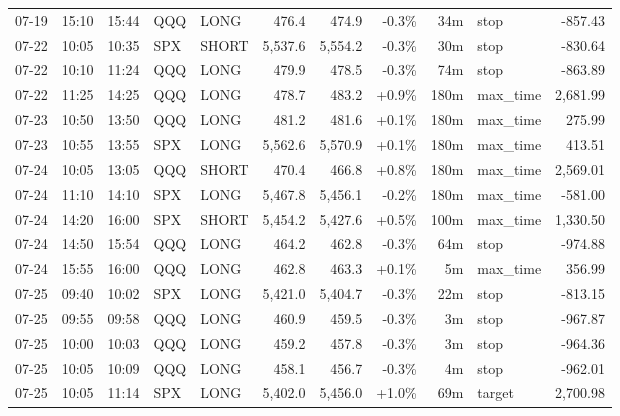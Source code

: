 \documentclass[11pt,a4paper,twoside]{article}
\begin{document}
\begin{center}
\begin{longtable}{>{\color{txtmain}}l l l l l r r r r >{\color{txtmain}}l r}
07-19 & 15:10 & 15:44 & QQQ & LONG & 476.4 & 474.9 & \textcolor{lossred}{-0.3\%} & 34m & stop & \textcolor{lossred}{-857.43} \\
07-22 & 10:05 & 10:35 & SPX & SHORT & 5,537.6 & 5,554.2 & \textcolor{lossred}{-0.3\%} & 30m & stop & \textcolor{lossred}{-830.64} \\
07-22 & 10:10 & 11:24 & QQQ & LONG & 479.9 & 478.5 & \textcolor{lossred}{-0.3\%} & 74m & stop & \textcolor{lossred}{-863.89} \\
07-22 & 11:25 & 14:25 & QQQ & LONG & 478.7 & 483.2 & \textcolor{wingreen}{+0.9\%} & 180m & max\_time & \textcolor{wingreen}{2,681.99} \\
07-23 & 10:50 & 13:50 & QQQ & LONG & 481.2 & 481.6 & \textcolor{wingreen}{+0.1\%} & 180m & max\_time & \textcolor{wingreen}{275.99} \\
07-23 & 10:55 & 13:55 & SPX & LONG & 5,562.6 & 5,570.9 & \textcolor{wingreen}{+0.1\%} & 180m & max\_time & \textcolor{wingreen}{413.51} \\
07-24 & 10:05 & 13:05 & QQQ & SHORT & 470.4 & 466.8 & \textcolor{wingreen}{+0.8\%} & 180m & max\_time & \textcolor{wingreen}{2,569.01} \\
07-24 & 11:10 & 14:10 & SPX & LONG & 5,467.8 & 5,456.1 & \textcolor{lossred}{-0.2\%} & 180m & max\_time & \textcolor{lossred}{-581.00} \\
07-24 & 14:20 & 16:00 & SPX & SHORT & 5,454.2 & 5,427.6 & \textcolor{wingreen}{+0.5\%} & 100m & max\_time & \textcolor{wingreen}{1,330.50} \\
07-24 & 14:50 & 15:54 & QQQ & LONG & 464.2 & 462.8 & \textcolor{lossred}{-0.3\%} & 64m & stop & \textcolor{lossred}{-974.88} \\
07-24 & 15:55 & 16:00 & QQQ & LONG & 462.8 & 463.3 & \textcolor{wingreen}{+0.1\%} & 5m & max\_time & \textcolor{wingreen}{356.99} \\
07-25 & 09:40 & 10:02 & SPX & LONG & 5,421.0 & 5,404.7 & \textcolor{lossred}{-0.3\%} & 22m & stop & \textcolor{lossred}{-813.15} \\
07-25 & 09:55 & 09:58 & QQQ & LONG & 460.9 & 459.5 & \textcolor{lossred}{-0.3\%} & 3m & stop & \textcolor{lossred}{-967.87} \\
07-25 & 10:00 & 10:03 & QQQ & LONG & 459.2 & 457.8 & \textcolor{lossred}{-0.3\%} & 3m & stop & \textcolor{lossred}{-964.36} \\
07-25 & 10:05 & 10:09 & QQQ & LONG & 458.1 & 456.7 & \textcolor{lossred}{-0.3\%} & 4m & stop & \textcolor{lossred}{-962.01} \\
07-25 & 10:05 & 11:14 & SPX & LONG & 5,402.0 & 5,456.0 & \textcolor{wingreen}{+1.0\%} & 69m & target & \textcolor{wingreen}{2,700.98} \\

\end{longtable}
\end{center}
\end{document}
